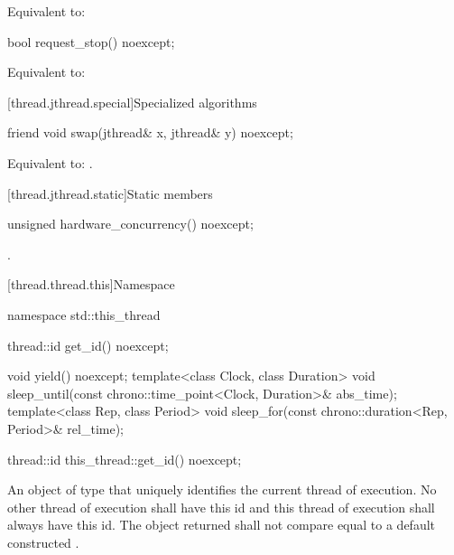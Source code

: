 \begin{itemdescr}
\pnum
\effects
Equivalent to: 
\end{itemdescr}

%
\begin{itemdecl}
bool request_stop() noexcept;
\end{itemdecl}

\begin{itemdescr}
\pnum
\effects
Equivalent to: 
\end{itemdescr}


[thread.jthread.special]{Specialized algorithms}

%
\begin{itemdecl}
friend void swap(jthread& x, jthread& y) noexcept;
\end{itemdecl}

\begin{itemdescr}
\pnum
\effects
Equivalent to: .
\end{itemdescr}

[thread.jthread.static]{Static members}

%
\begin{itemdecl}
unsigned hardware_concurrency() noexcept;
\end{itemdecl}

\begin{itemdescr}
\pnum
\returns
{}.
\end{itemdescr}


[thread.thread.this]{Namespace }

\begin{codeblock}
namespace std::this_thread {
  thread::id get_id() noexcept;

  void yield() noexcept;
  template<class Clock, class Duration>
    void sleep_until(const chrono::time_point<Clock, Duration>& abs_time);
  template<class Rep, class Period>
    void sleep_for(const chrono::duration<Rep, Period>& rel_time);
}
\end{codeblock}

%
\begin{itemdecl}
thread::id this_thread::get_id() noexcept;
\end{itemdecl}

\begin{itemdescr}
\pnum
\returns
An object of type  that uniquely identifies the current thread of
execution. No other thread of execution shall have this id and this thread of execution shall
always have this id. The object returned shall not compare equal to a default constructed
.
\end{itemdescr}

